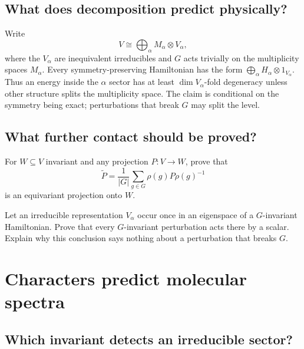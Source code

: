 \section{What does decomposition predict physically?}

Write
\[
V\cong\bigoplus_\alpha M_\alpha\otimes V_\alpha,
\]
where the $V_\alpha$ are inequivalent irreducibles and $G$ acts trivially on
the multiplicity spaces $M_\alpha$.  Every symmetry-preserving Hamiltonian
has the form $\bigoplus_\alpha H_\alpha\otimes1_{V_\alpha}$.  Thus an energy
inside the $\alpha$ sector has at least $\dim V_\alpha$-fold degeneracy unless
other structure splits the multiplicity space.  The claim is conditional on
the symmetry being exact; perturbations that break $G$ may split the level.

\section{What further contact should be proved?}

\begin{exercise}
For $W\subseteq V$ invariant and any projection $P:V\to W$, prove that
\[
\widetilde P=\frac1{|G|}\sum_{g\in G}\rho(g)P\rho(g)^{-1}
\]
is an equivariant projection onto $W$.
\end{exercise}

\begin{exercise}
Let an irreducible representation $V_\alpha$ occur once in an eigenspace of a
$G$-invariant Hamiltonian.  Prove that every $G$-invariant perturbation acts
there by a scalar.  Explain why this conclusion says nothing about a
perturbation that breaks $G$.
\end{exercise}


\chapter{Characters predict molecular spectra}
\label{ch:characters}



\section{Which invariant detects an irreducible sector?}

